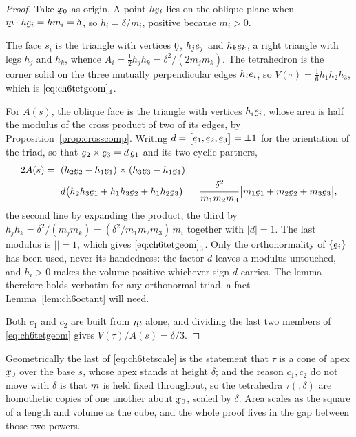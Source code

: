 \begin{proof}
Take $\bx_{0}$ as origin. A point $h\be_{i}$ lies on the oblique plane
when $\ip\bm{h\be_{i}}=hm_{i}=\delta$, so $h_{i}=\delta/m_{i}$, positive
because $m_{i}>0$.

The face $s_{i}$ is the triangle with vertices $\bze$, $h_{j}\be_{j}$
and $h_{k}\be_{k}$, a right triangle with legs $h_{j}$ and $h_{k}$,
whence $A_{i}=\tfrac12h_{j}h_{k}=\delta^{2}/(2m_{j}m_{k})$. The
tetrahedron is the corner solid on the three mutually perpendicular
edges $h_{i}\be_{i}$, so $V(\tau)=\tfrac16h_{1}h_{2}h_{3}$, which is
$\eqref{eq:ch6tetgeom}_{4}$.

For $A(s)$, the oblique face is the triangle with vertices
$h_{i}\be_{i}$, whose area is half the modulus of the cross product of
two of its edges, by Proposition~\ref{prop:crosscomp}. Writing
$d=\big[\be_{1},\be_{2},\be_{3}\big]=\pm1$ for the orientation of the
triad, so that $\be_{2}\times\be_{3}=d\,\be_{1}$ and its two cyclic
partners,
\[
\begin{aligned}
   2A(s)&=\big|(h_{2}\be_{2}-h_{1}\be_{1})
     \times(h_{3}\be_{3}-h_{1}\be_{1})\big|\\
   &=\big|d\big(h_{2}h_{3}\be_{1}+h_{1}h_{3}\be_{2}
     +h_{1}h_{2}\be_{3}\big)\big|
   =\frac{\delta^{2}}{m_{1}m_{2}m_{3}}
     \big|m_{1}\be_{1}+m_{2}\be_{2}+m_{3}\be_{3}\big| ,
\end{aligned}
\]
the second line by expanding the product, the third by
$h_{j}h_{k}=\delta^{2}/(m_{j}m_{k})
=(\delta^{2}/m_{1}m_{2}m_{3})\,m_{i}$ together with $|d|=1$. The last
modulus is $|\bm|=1$, which gives $\eqref{eq:ch6tetgeom}_{3}$. Only the
orthonormality of $\{\be_{i}\}$ has been used, never its handedness:
the factor $d$ leaves a modulus untouched, and $h_{i}>0$ makes the
volume positive whichever sign $d$ carries. The lemma therefore holds
verbatim for any orthonormal triad, a fact Lemma~\ref{lem:ch6octant}
will need.

Both $c_{1}$ and $c_{2}$ are built from $\bm$ alone, and dividing the
last two members of \eqref{eq:ch6tetgeom} gives
$V(\tau)/A(s)=\delta/3$.
\end{proof}

Geometrically the last of \eqref{eq:ch6tetscale} is the statement that
$\tau$ is a cone of apex $\bx_{0}$ over the base $s$, whose apex stands
at height $\delta$; and the reason $c_{1},c_{2}$ do not move with
$\delta$ is that $\bm$ is held fixed throughout, so the tetrahedra
$\tau(\bm,\delta)$ are homothetic copies of one another about $\bx_{0}$,
scaled by $\delta$. Area scales as the square of a length and volume as
the cube, and the whole proof lives in the gap between those two powers.


